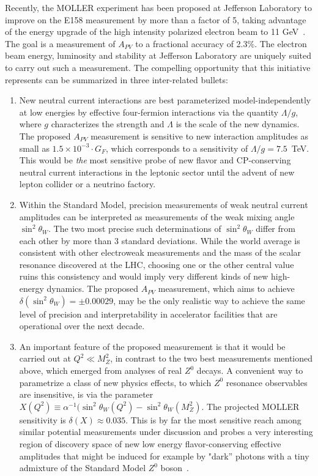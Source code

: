Recently, the MOLLER experiment has been proposed at Jefferson Laboratory to improve on the E158
measurement by more than a factor of 5, taking advantage of the energy upgrade of the high intensity
polarized electron beam to 11 GeV~\cite{ref:cl:Dudek:2012vr}. The goal is a measurement of $A_{PV}$ to a fractional accuracy
of 2.3\%. 
The electron beam energy, luminosity and stability at Jefferson Laboratory are uniquely suited to carry out such a measurement. 
The compelling opportunity that this initiative represents can be summarized in three inter-related bullets:
\begin{enumerate}
\item New neutral current interactions are best parameterized model-independently at low energies by effective 
four-fermion interactions via the quantity $\Lambda/g$, where $g$ characterizes the strength and $\Lambda$ is the
scale of the new dynamics. The proposed $A_{PV}$ measurement is sensitive to new interaction amplitudes as 
small as $1.5\times 10^{-3}\cdot G_F$, which corresponds to a sensitivity of $\Lambda/g =  7.5$~TeV. This would be {\it the} most sensitive probe of new flavor and CP-conserving 
neutral current interactions in the leptonic sector until the advent of new lepton collider or a neutrino factory. 
\item Within the Standard Model, precision measurements of weak neutral current amplitudes can be interpreted as measurements of the weak mixing angle $\sin^2\theta_W$. The two most precise such determinations of 
$\sin^2\theta_W$ differ from each other by more than 3 standard deviations. 
While the world average is consistent with other electroweak measurements and the mass of the scalar resonance 
discovered at the LHC, choosing one or the other central value ruins this consistency and would imply very
different kinds of new high-energy dynamics. The proposed $A_{PV}$ measurement, which aims to achieve
$\delta(\sin^2\theta_W) = \pm 0.00029$, may be the only realistic way to achieve the same level of precision and interpretability in accelerator facilities that are operational over the next decade.
\item An important feature of the proposed measurement is that it would be carried out at $Q^2\ll M_Z^2$, in contrast
to the two best measurements mentioned above, which emerged from analyses of real $Z^0$ decays. A 
convenient way to parametrize a class of new physics effects, to which $Z^0$ resonance observables are 
insensitive, is via the parameter 
$X(Q^2)\equiv\alpha^{-1}(\sin^2\theta_W(Q^2)-\sin^2\theta_W(M_Z^2)$. The projected MOLLER sensitivity is 
$\delta(X)\approx 0.035$. This is by far the most sensitive reach among similar potential
measurements under discussion and probes a very interesting region of discovery space of new low
energy flavor-conserving effective amplitudes that might be induced for example by "dark'' photons with 
a tiny admixture of the Standard Model $Z^0$ boson~\cite{ref:cl:darkz}. 
\end{enumerate}


